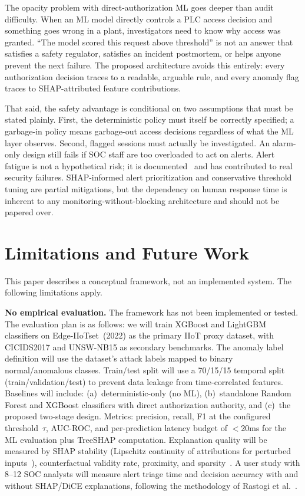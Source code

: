 \documentclass[conference]{IEEEtran}
\begin{document}
The opacity problem with direct-authorization ML goes deeper than audit difficulty. When an ML model directly controls a PLC access decision and something goes wrong in a plant, investigators need to know why access was granted. ``The model scored this request above threshold'' is not an answer that satisfies a safety regulator, satisfies an incident postmortem, or helps anyone prevent the next failure. The proposed architecture avoids this entirely: every authorization decision traces to a readable, arguable rule, and every anomaly flag traces to SHAP-attributed feature contributions.

That said, the safety advantage is conditional on two assumptions that must be stated plainly. First, the deterministic policy must itself be correctly specified; a garbage-in policy means garbage-out access decisions regardless of what the ML layer observes. Second, flagged sessions must actually be investigated. An alarm-only design still fails if SOC staff are too overloaded to act on alerts. Alert fatigue is not a hypothetical risk; it is documented~\cite{rastogi2025} and has contributed to real security failures. SHAP-informed alert prioritization and conservative threshold tuning are partial mitigations, but the dependency on human response time is inherent to any monitoring-without-blocking architecture and should not be papered over.

\section{Limitations and Future Work}

This paper describes a conceptual framework, not an implemented system. The following limitations apply.

\textbf{No empirical evaluation.} The framework has not been implemented or tested. The evaluation plan is as follows: we will train XGBoost and LightGBM classifiers on Edge-IIoTset~(2022) as the primary IIoT proxy dataset, with CICIDS2017 and UNSW-NB15 as secondary benchmarks. The anomaly label definition will use the dataset's attack labels mapped to binary normal/anomalous classes. Train/test split will use a 70/15/15 temporal split (train/validation/test) to prevent data leakage from time-correlated features. Baselines will include: (a)~deterministic-only (no ML), (b)~standalone Random Forest and XGBoost classifiers with direct authorization authority, and (c)~the proposed two-stage design. Metrics: precision, recall, F1 at the configured threshold~$\tau$, AUC-ROC, and per-prediction latency budget of $<$20ms for the ML evaluation plus TreeSHAP computation. Explanation quality will be measured by SHAP stability (Lipschitz continuity of attributions for perturbed inputs~\cite{alvarez2018}), counterfactual validity rate, proximity, and sparsity~\cite{verma2024}. A user study with 8--12 SOC analysts will measure alert triage time and decision accuracy with and without SHAP/DiCE explanations, following the methodology of Rastogi et al.~\cite{rastogi2025}.
\end{document}
